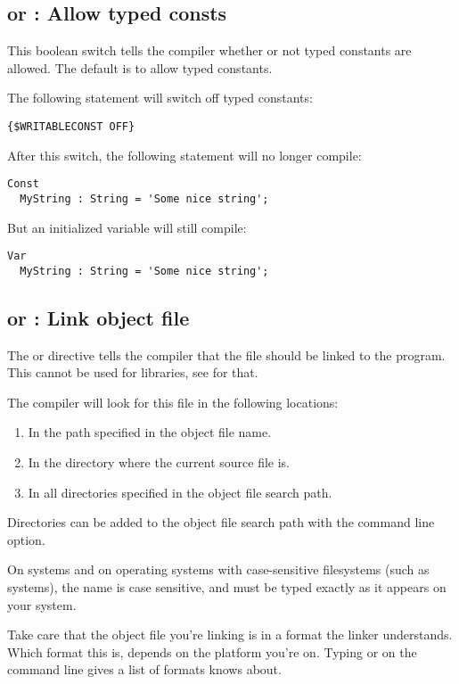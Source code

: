 \subsection{ or  : Allow typed consts}
This boolean switch tells the compiler whether or not typed constants are allowed.
The default is to allow typed constants.

The following statement will switch off typed constants:
\begin{verbatim}
{$WRITABLECONST OFF}
\end{verbatim}
After this switch, the following statement will no longer compile:
\begin{verbatim}
Const
  MyString : String = 'Some nice string';
\end{verbatim}
But an initialized variable will still compile:
\begin{verbatim}
Var
  MyString : String = 'Some nice string';
\end{verbatim}



\subsection{ or  : Link object file}

The  or  directive
tells the compiler that the file  should be linked to
the program. This cannot be used for libraries, see  for that.

The compiler will look for this file in the following locations:
\begin{enumerate}
\item In the path specified in the object file name.
\item In the directory where the current source file is.
\item In all directories specified in the object file search path.
\end{enumerate}
Directories can be added to the object file search path with the 
command line option.

On \linux systems and on operating systems with case-sensitive filesystems
(such as \unix systems), the name is case sensitive, and must be typed
exactly as it appears on your system.

\begin{remark}Take care that the object file you're linking is in a
format the linker understands. Which format this is, depends on the platform
you're on. Typing  or  on the command line gives a list of formats
 knows about.
\end{remark}

